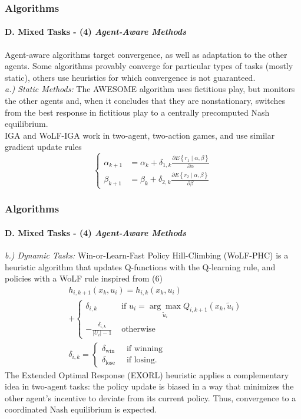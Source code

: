 \documentclass{beamer}
\begin{document}
\begin{frame}
\frametitle{Algorithms}
\framesubtitle{D. Mixed Tasks - (4) \textit{Agent-Aware Methods}}
Agent-aware algorithms target
convergence, as well as adaptation to the other agents. Some
algorithms provably converge for particular types of tasks
(mostly static), others use heuristics for which convergence is
not guaranteed.\\
\textit{a.) Static Methods:} 	The AWESOME algorithm uses fictitious play,
but monitors the other agents and, when it concludes that they
are nonstationary, switches from the best response in fictitious
play to a centrally precomputed Nash equilibrium.\\
IGA and WoLF-IGA
work in two-agent, two-action games, and use similar gradient
update rules
\begin{equation}
\left\{\begin{aligned} \alpha_{k+1} & =\alpha_k+\delta_{1, k} \frac{\partial E\left\{r_1 \mid \alpha, \beta\right\}}{\partial \alpha} \\ \beta_{k+1} & =\beta_k+\delta_{2, k} \frac{\partial E\left\{r_2 \mid \alpha, \beta\right\}}{\partial \beta}\end{aligned}\right.
\end{equation}
\end{frame}

\begin{frame}
\frametitle{Algorithms}
\framesubtitle{D. Mixed Tasks - (4) \textit{Agent-Aware Methods}}
\textit{b.) Dynamic Tasks:} Win-or-Learn-Fast Policy Hill-Climbing
(WoLF-PHC) is a heuristic algorithm that updates Q-functions with the Q-learning rule, and policies with a WoLF
rule inspired from (6)
\begin{equation}
\begin{aligned} & h_{i, k+1}\left(x_k, u_i\right)=h_{i, k}\left(x_k, u_i\right) \\ & + \begin{cases}\delta_{i, k} & \text { if } u_i=\underset{\tilde{u}_i}{\arg \max } Q_{i, k+1}\left(x_k, \tilde{u}_i\right) \\ -\frac{\delta_{i, k}}{\left|U_i\right|-1} & \text { otherwise }\end{cases} \\ & \delta_{i, k}= \begin{cases}\delta_{\text {win }} & \text { if winning } \\ \delta_{\text {lose }} & \text { if losing. }\end{cases} \end{aligned}
\end{equation}
The Extended Optimal Response (EXORL) heuristic applies a complementary idea in two-agent tasks: the policy update
is biased in a way that minimizes the other agent’s incentive to deviate from its current policy. Thus, convergence to a coordinated Nash equilibrium is expected.
\end{frame}
\end{document}
